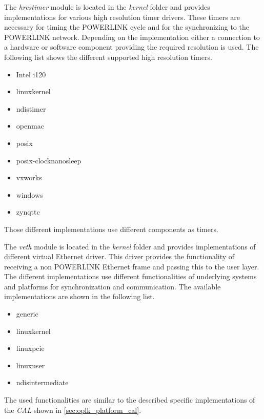 \begin{description}[leftmargin=1cm]
    \item[hrestimer] The \emph{hrestimer} module is located in the \emph{kernel} folder and provides implementations for various high resolution timer drivers.
    These timers are necessary for timing the POWERLINK cycle and for the synchronizing to the POWERLINK network.
    Depending on the implementation either a connection to a hardware or software component providing the required resolution is used.
    The following list shows the different supported high resolution timers.
    \begin{multicols}{3}
        \begin{itemize}
            \item Intel i120
            \item linuxkernel
            \item ndistimer
            \item openmac
            \item posix
            \item posix-clocknanosleep
            \item vxworks
            \item windows
            \item zynqttc
        \end{itemize}
    \end{multicols}
    Those different implementations use different components as timers.
    
    \item[veth] The \emph{veth} module is located in the \emph{kernel} folder and provides implementations of different virtual Ethernet driver.
    This driver provides the functionality of receiving a non POWERLINK Ethernet frame and passing this to the user layer.
    The different implementations use different functionalities of underlying systems and platforms for synchronization and communication.
    The available implementations are shown in the following list.
    \begin{multicols}{3}
        \begin{itemize}
            \item generic
            \item linuxkernel
            \item linuxpcie
            \item linuxuser
            \item ndisintermediate
        \end{itemize}
    \end{multicols}
    The used functionalities are similar to the described specific implementations of the \emph{CAL} shown in \ref{sec:oplk_platform_cal}.\\
    

\end{description}
